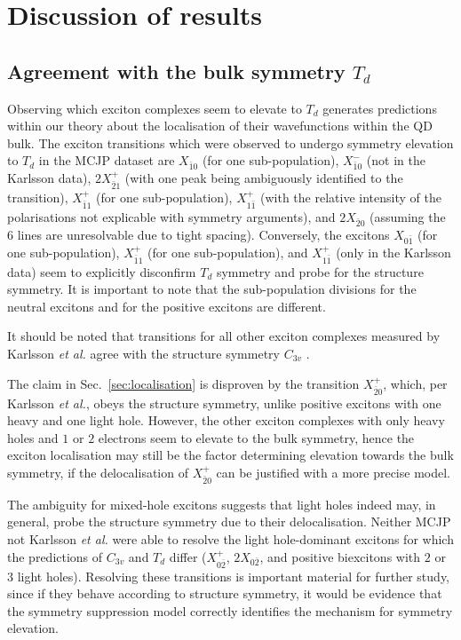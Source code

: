 \section{Discussion of results}

\subsection{Agreement with the bulk symmetry $T_d$}
Observing which exciton complexes seem to elevate to $T_d$ generates predictions within our theory about the localisation of their wavefunctions within the QD bulk. The exciton transitions which were observed to undergo symmetry elevation to $T_d$ in the MCJP dataset are $X_{\bar{1}0}$ (for one sub-population), $X^-_{\bar{1}0}$ (not in the Karlsson data), $2X^+_{\bar{2}1}$ (with one peak being ambiguously identified to the transition), $X^+_{\bar{1}1}$ (for one sub-population),  $X^+_{1\bar{1}}$ (with the relative intensity of the polarisations not explicable with symmetry arguments), and $2X_{\bar{2}0}$ (assuming the $6$ lines are unresolvable due to tight spacing). Conversely, the excitons $X_{0\bar{1}}$ (for one sub-population), $X^+_{\bar{1}1}$ (for one sub-population), and $X^+_{1\bar{1}}$ (only in the Karlsson data) seem to explicitly disconfirm $T_d$ symmetry and probe for the structure symmetry. It is important to note that the sub-population divisions for the neutral excitons and for the positive excitons are different.

It should be noted that transitions for all other exciton complexes measured by Karlsson \textit{et al.} agree with the structure symmetry $C_{3v}$ \cite[p.~20]{karlsson}.

The claim in Sec.~\ref{sec:localisation} is disproven by the transition $X^+_{\bar{2}0}$, which, per Karlsson \textit{et al.}, obeys the structure symmetry, unlike positive excitons with one heavy and one light hole. However, the other exciton complexes with only heavy holes and $1$ or $2$ electrons seem to elevate to the bulk symmetry, hence the exciton localisation may still be the factor determining elevation towards the bulk symmetry, if the delocalisation of $X^+_{\bar{2}0}$ can be justified with a more precise model.

The ambiguity for mixed-hole excitons suggests that light holes indeed may, in general, probe the structure symmetry due to their delocalisation. Neither MCJP not Karlsson \textit{et al.} were able to resolve the light hole-dominant excitons for which the predictions of $C_{3v}$ and $T_d$ differ ($X^+_{0\bar{2}}$, $2X_{0\bar{2}}$, and positive biexcitons with $2$ or $3$ light holes). Resolving these transitions is important material for further study, since if they behave according to structure symmetry, it would be evidence that the symmetry suppression model correctly identifies the mechanism for symmetry elevation.

